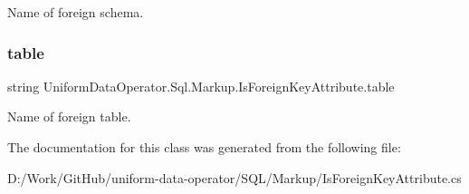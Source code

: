 Name of foreign schema. 

\mbox{\label{class_uniform_data_operator_1_1_sql_1_1_markup_1_1_is_foreign_key_attribute_ae210d1001824383251ca3ba1a0f3fd20}} 
\subsubsection{\texorpdfstring{table}{table}}
{\footnotesize\ttfamily string Uniform\+Data\+Operator.\+Sql.\+Markup.\+Is\+Foreign\+Key\+Attribute.\+table}



Name of foreign table. 



The documentation for this class was generated from the following file\+:\begin{DoxyCompactItemize}
\item 
D\+:/\+Work/\+Git\+Hub/uniform-\/data-\/operator/\+S\+Q\+L/\+Markup/Is\+Foreign\+Key\+Attribute.\+cs\end{DoxyCompactItemize}
